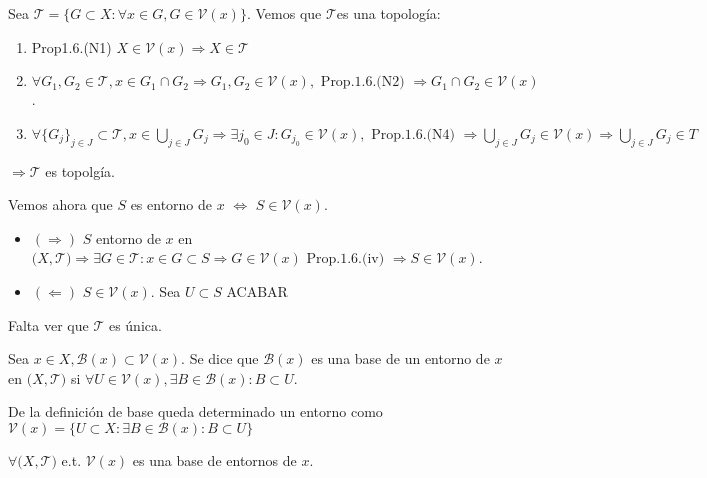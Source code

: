 \begin{dem}
  Sea $ \mathcal{T} = \{ G \subset X :\forall x \in G, G \in \mathcal{V}(x) \}$. Vemos que $\mathcal{T}$es una topología:
  \begin{enumerate}[label=(\roman*)]
    \item Prop1.6.(N1) $X \in \mathcal{V}(x) \Rightarrow X \in \mathcal{T}$
    \item $\forall G_{1},G_{2} \in \mathcal{T}, x \in G_{1} \cap G_{2} \Rightarrow G_{1},G_{2} \in \mathcal{V}(x), \text{ Prop.1.6.(N2) } \Rightarrow G_{1} \cap G_{2} \in \mathcal{V}(x)$.
    \item $\forall \{ G_{j} \}_{j \in J} \subset \mathcal{T}, x \in \bigcup_{j \in J} G_{j} \Rightarrow \exists j_{0} \in J : G_{j_{0}} \in \mathcal{V}(x), \text{ Prop.1.6.(N4) } \Rightarrow \bigcup_{j \in J} G_{j} \in \mathcal{V}(x) \Rightarrow \bigcup_{j \in J} G_{j} \in T$
  \end{enumerate}
$\Rightarrow \mathcal{T} $ es topolgía.

Vemos ahora que $S$ es entorno de $x$ $\Leftrightarrow$ $ S \in \mathcal{V}(x)$.

\begin{itemize}
  \item $(\Rightarrow)$ $S$ entorno de $x$ en $\big( X, \mathcal{T} \big) \Rightarrow \exists G \in \mathcal{T}: x \in G \subset S \Rightarrow G \in \mathcal{V}(x) \text{ Prop.1.6.(iv) } \Rightarrow S \in \mathcal{V}(x)$. 
  \item $(\Leftarrow)$ $S \in \mathcal{V}(x)$. Sea $ U \subset S$ ACABAR
\end{itemize}
Falta ver que $\mathcal{T}$ es única.
\end{dem}

\begin{defn}
  Sea $ x \in X, \mathcal{B}(x) \subset \mathcal{V}(x)$. Se dice que $\mathcal{B}(x)$ es una base de un entorno de $x$ en $\big( X, \mathcal{T} \big)$ si $\forall U \in \mathcal{V}(x), \exists B \in \mathcal{B}(x): B \subset U$.
\end{defn}

\begin{obs}
  De la definición de base queda determinado un entorno como $ \mathcal{V}(x) = \{ U \subset X: \exists B \in \mathcal{B}(x): B \subset U \}$
\end{obs}

\begin{ejm}
  $\forall \big( X, \mathcal{T} \big)$ e.t. $\mathcal{V}(x)$ es una base de entornos de $x$.
\end{ejm}

